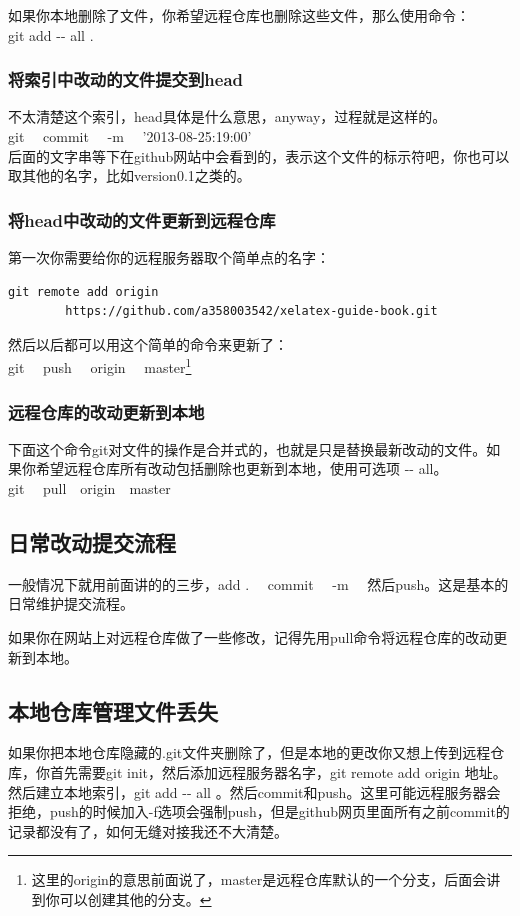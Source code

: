 \documentclass[12pt,oneside]{book}
\begin{document}
\begin{common-format}
如果你本地删除了文件，你希望远程仓库也删除这些文件，那么使用命令：\\
git  add  -{}- all   .  


\subsubsection{将索引中改动的文件提交到head}
不太清楚这个索引，head具体是什么意思，anyway，过程就是这样的。\\
git ~~commit ~~-m ~~'2013-08-25:19:00' \\
后面的文字串等下在github网站中会看到的，表示这个文件的标示符吧，你也可以取其他的名字，比如version0.1之类的。

\subsubsection{将head中改动的文件更新到远程仓库}
第一次你需要给你的远程服务器取个简单点的名字：
\begin{Verbatim}
git remote add origin 
        https://github.com/a358003542/xelatex-guide-book.git
\end{Verbatim}

然后以后都可以用这个简单的命令来更新了：\\
git~~ push~~ origin~~ master\footnote{这里的origin的意思前面说了，master是远程仓库默认的一个分支，后面会讲到你可以创建其他的分支。}

\subsubsection{远程仓库的改动更新到本地}
下面这个命令git对文件的操作是合并式的，也就是只是替换最新改动的文件。如果你希望远程仓库所有改动包括删除也更新到本地，使用可选项 -{}- all。\\
git ~~pull~~origin~~master


\subsection{日常改动提交流程}
一般情况下就用前面讲的的三步，add .~~ commit ~~-m~~ 然后push。这是基本的日常维护提交流程。

如果你在网站上对远程仓库做了一些修改，记得先用pull命令将远程仓库的改动更新到本地。

\subsection{本地仓库管理文件丢失}
如果你把本地仓库隐藏的.git文件夹删除了，但是本地的更改你又想上传到远程仓库，你首先需要git init，然后添加远程服务器名字，git remote add origin 地址。然后建立本地索引，git add -{}- all  。然后commit和push。这里可能远程服务器会拒绝，push的时候加入-f选项会强制push，但是github网页里面所有之前commit的记录都没有了，如何无缝对接我还不大清楚。



\end{common-format}
\end{document}
